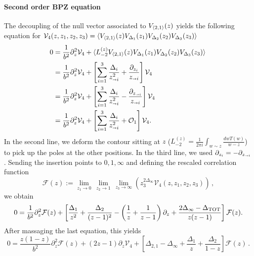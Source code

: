 \documentclass[a4paper]{article}
\begin{document}
\paragraph{Second order BPZ equation}
The decoupling of the null vector associated to $V_{\braket{2,1}}(z)$ yields the following equation
for $\mathcal{V}_{4}(z,z_1,z_2,z_3)=\braket{V_{\braket{2,1}}(z)V_{\Delta_1}(z_1)V_{\Delta_2}(z_2)V_{\Delta_3}(z_3)}$
\begin{equation}
\begin{aligned}
  0 &=\frac{1}{b^2}\partial_z^2 \mathcal{V}_{4} +\braket{L_{-2}^{(z)}V_{\braket{2,1}}(z)V_{\Delta_1}(z_1)V_{\Delta_2}(z_2)V_{\Delta_3}(z_3)}\,\\
  &=\frac{1}{b^2}\partial_z^2 \mathcal{V}_{4} +\left[\sum_{i=1}^{3}\frac{\Delta_i}{z_{\shortrightarrow i}^2}+\frac{\partial_{z_i}}{z_{\shortrightarrow i}}\right]\mathcal{V}_{4}\,\\
  &=\frac{1}{b^2}\partial_z^2 \mathcal{V}_{4} +\left[\sum_{i=1}^{3}\frac{\Delta_i}{z_{\shortrightarrow i}^2}-\frac{\partial_{z_{\shortrightarrow i}}}{z_{\shortrightarrow i}}\right]\mathcal{V}_{4}\,\\
  &=\frac{1}{b^2}\partial_z^2 \mathcal{V}_{4} +\left[\sum_{i=1}^{3}\frac{\Delta_i}{z_{\shortrightarrow i}^2}+ \mathcal{O}_1\right]\mathcal{V}_{4}.\\
\end{aligned}
\end{equation}
In the second line, we deform the contour sitting at $z$ ($L_{-2}^{(z)}=\frac{1}{2\pi i}\int_{w \sim z}\frac{dw T(w)}{w-z}$) to pick up the poles at the other positions. In the third line, we used $\partial_{z_i}=-\partial_{z_{\shortrightarrow i}}$. Sending the insertion points to $0,1,\infty$ and defining the rescaled correlation function
\begin{equation}
  \mathcal{F}(z) := \underset{z_1 \to 0}{\lim} \,\underset{z_2 \to 1}{\lim}\, \underset{z_3 \to \infty}{\lim} \left(z_3^{2\Delta_{\infty}}\mathcal{V}_{4}(z,z_1,z_2,z_3)\right)\,,
\end{equation}
we obtain
\begin{equation}
  0 =\frac{1}{b^2}\partial_z^2 \mathcal{F}(z) +\left[\frac{\Delta_1}{z^2}+\frac{\Delta_2}{(z-1)^2}-\left(\frac{1}{z}+\frac{1}{z-1}\right)\partial_z +\frac{2\Delta_{\infty} -\Delta_{\rm TOT}}{z(z-1)}\right]\mathcal{F}(z).\\
\end{equation}
After massaging the last equation, this yields
\begin{equation}
  0 =\frac{z(1-z)}{b^2}\partial_z^2 \mathcal{F}(z) +(2z-1) \partial_z \mathcal{V}_{4} + \left[\Delta_{2,1}-\Delta_{\infty}+\frac{\Delta_1}{z}+\frac{\Delta_2}{1-z}\right]\mathcal{F}(z)\,.
\end{equation}
\end{document}
